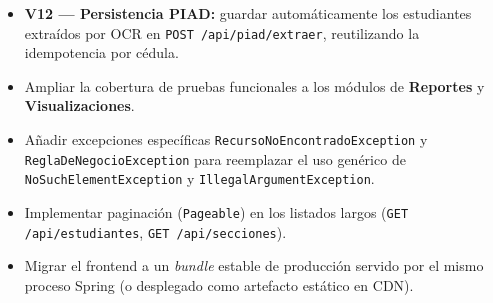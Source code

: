 \documentclass[11pt,a4paper,oneside]{article}
\newcommand{\code}[1]{\texttt{\small #1}}
\begin{document}
\begin{ataracaja}[title=Trabajo futuro recomendado]
\begin{itemize}[leftmargin=*]
  \item \textbf{V12 — Persistencia PIAD:} guardar automáticamente los estudiantes extraídos
        por OCR en \code{POST /api/piad/extraer}, reutilizando la idempotencia por cédula.
  \item Ampliar la cobertura de pruebas funcionales a los módulos de \textbf{Reportes} y
        \textbf{Visualizaciones}.
  \item Añadir excepciones específicas \code{RecursoNoEncontradoException} y
        \code{ReglaDeNegocioException} para reemplazar el uso genérico de
        \code{NoSuchElementException} y \code{IllegalArgumentException}.
  \item Implementar paginación (\code{Pageable}) en los listados largos
        (\code{GET /api/estudiantes}, \code{GET /api/secciones}).
  \item Migrar el frontend a un \emph{bundle} estable de producción servido por el mismo
        proceso Spring (o desplegado como artefacto estático en CDN).
\end{itemize}
\end{ataracaja}
\end{document}
